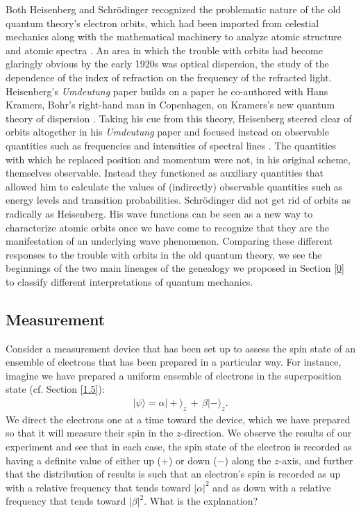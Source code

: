 Both Heisenberg and Schr\"odinger recognized the problematic nature of the old quantum theory's electron orbits, which had been imported from celestial mechanics along with the mathematical machinery to analyze atomic structure and atomic spectra \citep[p.\ 171]{Janssen 2019}. An area in which the trouble with orbits had become glaringly obvious by the early 1920s was optical dispersion, the study of the dependence of the index of refraction on the frequency of the refracted light. Heisenberg's \emph{Umdeutung} paper builds on a paper he co-authored with Hans Kramers, Bohr's right-hand man in Copenhagen, on Kramers's new quantum theory of dispersion \citep{Kramers and Heisenberg 1925}. Taking his cue from this theory, Heisenberg steered clear of orbits altogether in his \emph{Umdeutung} paper and focused instead on observable quantities such as frequencies and intensities of spectral lines \citep[pp.\ 134--142]{Duncan and Janssen 2007, Janssen 2009}. The quantities with which he replaced position and momentum were not, in his original scheme, themselves observable. Instead they functioned as auxiliary quantities that allowed him to calculate the values of (indirectly) observable quantities such as energy levels and transition probabilities. Schr\"odinger did not get rid of orbits as radically as Heisenberg. His wave functions can be seen as a new way to characterize atomic orbits once we have come to recognize that they are the manifestation of an underlying wave phenomenon. Comparing these different responses to the trouble with orbits in the old quantum theory, we see the beginnings of the two main lineages of the genealogy we proposed in Section \ref{0} to classify different interpretations of quantum mechanics.

\subsection{Measurement}
\label{4.4}

Consider a measurement device that has been set up to assess the spin state of an ensemble of electrons that has been prepared in a particular way. For instance, imagine we have prepared a uniform ensemble of electrons in the superposition state (cf. Section \ref{1.5}):
\begin{align}
  \label{eqn:pm-superpos}
  | \psi \rangle = \alpha | + \rangle_z \, + \, \beta | - \rangle_z.
\end{align}
We direct the electrons one at a time toward the device, which we have prepared so that it will measure their spin in the $z$-direction. We observe the results of our experiment and see that in each case, the spin state of the electron is recorded as having a definite value of either up ($+$) or down ($-$) along the $z$-axis, and further that the distribution of results is such that an electron's spin is recorded as up with a relative frequency that tends toward $|\alpha|^2$ and as down with a relative frequency that tends toward $|\beta|^2$. What is the explanation?

